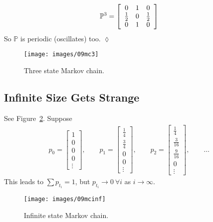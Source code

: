 \begin{example}
\begin{align*}
\begin{split}
\end{split}
\begin{split}
\mathbb{P}^3 = \left[\begin{array}{c c c} 0 & 1 & 0 \\ \frac{1}{2} & 0 & \frac{1}{2} \\ 0 & 1 & 0 \end{array}\right]
\end{split}
\end{align*}
So $\mathbb{P}$ is periodic (oscillates) too.
$\lozenge$
\end{example}

\begin{figure}[ht!]
\centering
\texttt{[image: images/09mc3]}
\caption{Three state Markov chain.}%
\label{fig:09mc3}
\end{figure}

\subsection{Infinite Size Gets Strange}
See Figure~\ref{fig:09mcinf}.
Suppose
\begin{align*}
p_0 = \left[\begin{array}{c} 1 \\ 0 \\ 0 \\ 0 \\ \vdots \end{array}\right],
\qquad p_1 = \left[\begin{array}{c} \frac{1}{4} \\ \frac{3}{4} \\ 0 \\ 0 \\ \vdots \end{array}\right],
\qquad p_2 = \left[\begin{array}{c} \frac{1}{4} \\ \frac{3}{16} \\ \frac{9}{16} \\ 0 \\ \vdots \end{array}\right],
\qquad \ldots
\end{align*}
This leads to $\sum p_{t_i}=1$, but $p_{t_i}\rightarrow 0~\forall i$ as $i\to\infty$.

\begin{figure}[ht!]
\centering
\texttt{[image: images/09mcinf]}
\caption{Infinite state Markov chain.}%
\label{fig:09mcinf}
\end{figure}

